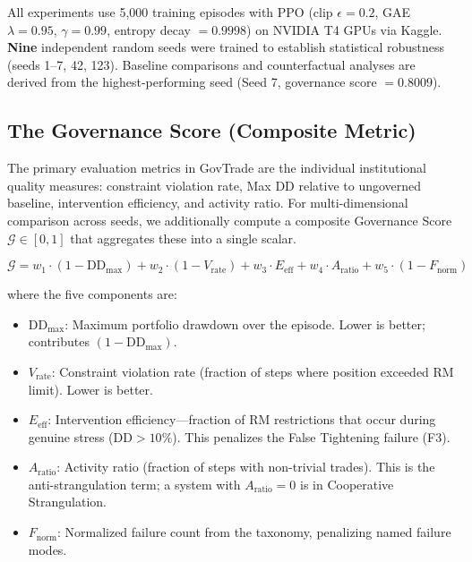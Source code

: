\documentclass[11pt]{article}
\begin{document}
All experiments use 5{,}000 training episodes with PPO (clip $\epsilon = 0.2$, GAE $\lambda = 0.95$, $\gamma = 0.99$, entropy decay $= 0.9998$) on NVIDIA T4 GPUs via Kaggle. \textbf{Nine} independent random seeds were trained to establish statistical robustness (seeds 1--7, 42, 123). Baseline comparisons and counterfactual analyses are derived from the highest-performing seed (Seed 7, governance score $= 0.8009$).

\subsection{The Governance Score (Composite Metric)}
\label{sec:gov_score}

The primary evaluation metrics in GovTrade are the individual institutional quality measures: constraint violation rate, Max DD relative to ungoverned baseline, intervention efficiency, and activity ratio. For multi-dimensional comparison across seeds, we additionally compute a composite Governance Score $\mathcal{G} \in [0, 1]$ that aggregates these into a single scalar.

\begin{equation}
    \mathcal{G} = w_1 \cdot (1 - \text{DD}_{\max}) + w_2 \cdot (1 - V_{\text{rate}}) + w_3 \cdot E_{\text{eff}} + w_4 \cdot A_{\text{ratio}} + w_5 \cdot (1 - F_{\text{norm}})
\end{equation}

where the five components are:

\begin{itemize}[leftmargin=*]
    \item $\text{DD}_{\max}$: Maximum portfolio drawdown over the episode. Lower is better; contributes $(1 - \text{DD}_{\max})$.
    \item $V_{\text{rate}}$: Constraint violation rate (fraction of steps where position exceeded RM limit). Lower is better.
    \item $E_{\text{eff}}$: Intervention efficiency---fraction of RM restrictions that occur during genuine stress ($\text{DD} > 10\%$). This penalizes the False Tightening failure (F3).
    \item $A_{\text{ratio}}$: Activity ratio (fraction of steps with non-trivial trades). This is the anti-strangulation term; a system with $A_{\text{ratio}} = 0$ is in Cooperative Strangulation.
    \item $F_{\text{norm}}$: Normalized failure count from the taxonomy, penalizing named failure modes.
\end{itemize}
\end{document}
